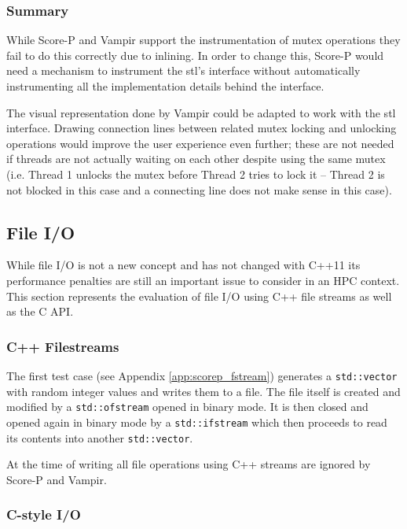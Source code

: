 \subsubsection{Summary}

While Score-P and Vampir support the instrumentation of mutex operations they fail to do this correctly due to inlining. In order to change this, Score-P would need a mechanism to instrument the \gls{stl}'s interface without automatically instrumenting all the implementation details behind the interface.

The visual representation done by Vampir could be adapted to work with the \gls{stl} interface. Drawing connection lines between related mutex locking and unlocking operations would improve the user experience even further; these are not needed if threads are not actually waiting on each other despite using the same mutex (i.e. Thread 1 unlocks the mutex before Thread 2 tries to lock it -- Thread 2 is not blocked in this case and a connecting line does not make sense in this case).

\subsection{File I/O}

While file I/O is not a new concept and has not changed with C++11 its performance penalties are still an important issue to consider in an HPC context. This section represents the evaluation of file I/O using C++ file streams as well as the C API.

\subsubsection{C++ Filestreams}\label{scorep:fstream}

The first test case (see Appendix \ref{app:scorep_fstream}) generates a \texttt{std::vector} with random integer values and writes them to a file. The file itself is created and modified by a \texttt{std::ofstream} opened in binary mode. It is then closed and opened again in binary mode by a \texttt{std::ifstream} which then proceeds to read its contents into another \texttt{std::vector}.

At the time of writing all file operations using C++ streams are ignored by Score-P and Vampir.

\subsubsection{C-style I/O}\label{scorep:c_io}


